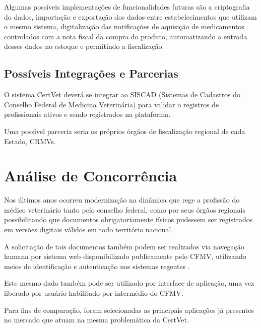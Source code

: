 \documentclass[
    12pt,               %
    openright,          %
    oneside,
    a4paper,            %
    BIBLATEX,           %
    TODO,               %
    english,            %
    brazil              %
    ]{ifsp-spo-inf-ctds}
\begin{document}
            Algumas possíveis implementações de funcionalidades futuras são a criptografia do dados, importação e exportação dos dados entre estabelecimentos que utilizam o mesmo sistema, digitalização das notificações de aquisição de medicamentos controlados com a nota fiscal da compra do produto, automatizando a entrada desses dados no estoque e permitindo a fiscalização.
        
        \subsection{Possíveis Integrações e Parcerias}
        
            O sistema CertVet deverá se integrar ao SISCAD (Sistemas de Cadastros do Conselho Federal de Medicina Veterinária) para validar o registros de profissionais ativos e sendo registrados na plataforma.
            
            Uma possível parceria seria os próprios órgãos de fiscalização regional de cada Estado, CRMVs.
    
    \section{Análise de Concorrência}

        Nos últimos anos ocorreu modernização na dinâmica que rege a profissão do médico veterinário tanto pelo conselho federal, como por seus órgãos regionais \cite{art_digital} \cite{cart_digital} possibilitando que documentos obrigatoriamente físicos pudessem ser registrados em versões digitais válidos em todo território nacional. 
        
        A solicitação de tais documentos também podem ser realizados via navegação humana por sistema web disponibilizado publicamente pelo CFMV, utilizando meios de identificação e autenticação nos sistemas regentes \cite{art_digital}.
        
        Este mesmo dado também pode ser utilizado por interface de aplicação, uma vez liberado por usuário habilitado por intermédio do CFMV.
    
        Para fins de comparação, foram selecionadas as principais aplicações já presentes no mercado que atuam na mesma problemática da CertVet.
\end{document}
